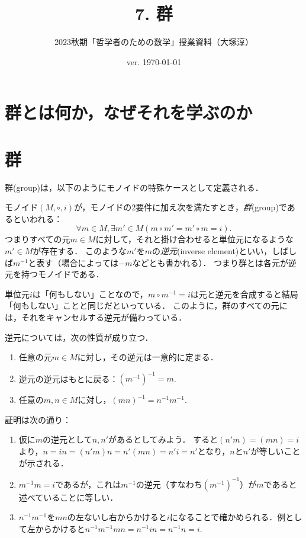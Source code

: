 \documentclass[11pt,a4paper]{jsarticle}
\begin{document}
\title{7. 群}
\author{2023秋期「哲学者のための数学」授業資料（大塚淳）}
\date{ver. \today}
\maketitle

\section{群とは何か，なぜそれを学ぶのか}


\section{群}
群(group)は，以下のようにモノイドの特殊ケースとして定義される．
\begin{dfn}[群]
    モノイド$(M, \circ, i)$が，モノイドの2要件に加え次を満たすとき，\emph{群}(group)であるといわれる：
    \[ \forall m \in M, \exists m' \in M (m \circ m' = m' \circ m = i).\]
    つまりすべての元$m \in M$に対して，それと掛け合わせると単位元になるような$m' \in M$が存在する．
    このような$m'$を$m$の\emph{逆元}(inverse element)といい，しばしば$m^{-1}$と表す（場合によっては$-m$などとも書かれる）．
    つまり群とは各元が逆元を持つモノイドである．
\end{dfn}    

単位元$i$は「何もしない」ことなので，$m \circ m^{-1} = i$は元と逆元を合成すると結局「何もしない」ことと同じだといっている．
このように，群のすべての元には，それをキャンセルする逆元が備わっている．

逆元については，次の性質が成り立つ．
\begin{enumerate}
    \item 任意の元$m \in M$に対し，その逆元は一意的に定まる．
    \item 逆元の逆元はもとに戻る：$(m^{-1})^{-1}=m$.
    \item 任意の$m,n \in M$に対し，$(mn)^{-1}=n^{-1}m^{-1}$.
\end{enumerate}
証明は次の通り：
\begin{enumerate}
    \item 仮に$m$の逆元として$n, n'$があるとしてみよう．
    すると$(n'm)=(mn)=i$より，$n = in = (n'm)n = n'(mn) = n'i = n'$となり，$n$と$n'$が等しいことが示される．
    \item $m^{-1}m=i$であるが，これは$m^{-1}$の逆元（すなわち$(m^{-1})^{-1}$）が$m$であると述べていることに等しい．
    \item $n^{-1}m^{-1}$を$mn$の左ないし右からかけると$i$になることで確かめられる．例として左からかけると$n^{-1}m^{-1}mn = n^{-1} i n = n^{-1}n = i$.
\end{enumerate}
\end{document}
